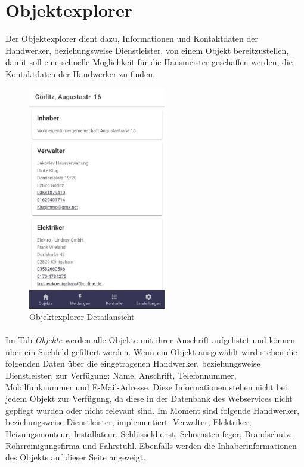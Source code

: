 \documentclass[12pt]{article}
\begin{document}
\section{Objektexplorer}
Der Objektexplorer dient dazu, Informationen und Kontaktdaten der Handwerker, beziehungsweise Dienstleister, von einem Objekt bereitzustellen, damit soll eine schnelle Möglichkeit für die Hausmeister geschaffen werden, die Kontaktdaten der Handwerker zu finden.

\begin{figure}
	\includegraphics[width=6cm]{Bilder/object-explorer-2.jpg}
	\caption{Objektexplorer Detailansicht}
	\vspace{-0.75cm}
\end{figure}
\paragraph{}Im Tab \textit{Objekte} werden alle Objekte mit ihrer Anschrift aufgelistet und können über ein Suchfeld gefiltert werden. Wenn ein Objekt ausgewählt wird stehen die folgenden Daten über die eingetragenen Handwerker, beziehungsweise Dienstleister, zur Verfügung: Name, Anschrift, Telefonnummer, Mobilfunknummer und E-Mail-Adresse. Diese Informationen stehen nicht bei jedem Objekt zur Verfügung, da diese in der Datenbank des Webservices nicht gepflegt wurden oder nicht relevant sind. Im Moment sind folgende Handwerker, beziehungsweise Dienstleister, implementiert: Verwalter, Elektriker, Heizungsmonteur, Installateur, Schlüsseldienst, Schornsteinfeger, Brandschutz, Rohrreinigungsfirma und Fahrstuhl. Ebenfalls werden die Inhaberinformationen des Objekts auf dieser Seite angezeigt.
\end{document}
